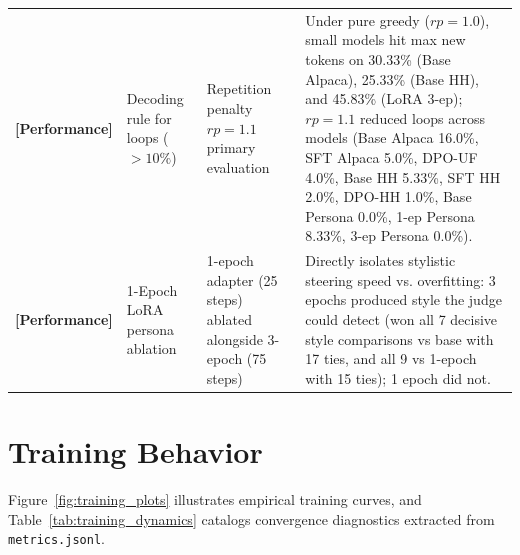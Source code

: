 \documentclass[11pt,a4paper]{article}
\begin{document}
\begin{table}[t]
\begin{tabularx}{\textwidth}{lp{2.5cm}p{3.2cm}X}
\textbf{[Performance]} & Decoding rule for loops ($>10\%$) & Repetition penalty $rp=1.1$ primary evaluation & Under pure greedy ($rp=1.0$), small models hit max new tokens on 30.33\% (Base Alpaca), 25.33\% (Base HH), and 45.83\% (LoRA 3-ep); $rp=1.1$ reduced loops across models (Base Alpaca 16.0\%, SFT Alpaca 5.0\%, DPO-UF 4.0\%, Base HH 5.33\%, SFT HH 2.0\%, DPO-HH 1.0\%, Base Persona 0.0\%, 1-ep Persona 8.33\%, 3-ep Persona 0.0\%). \\
\textbf{[Performance]} & 1-Epoch LoRA persona ablation & 1-epoch adapter (25 steps) ablated alongside 3-epoch (75 steps) & Directly isolates stylistic steering speed vs. overfitting: 3 epochs produced style the judge could detect (won all 7 decisive style comparisons vs base with 17 ties, and all 9 vs 1-epoch with 15 ties); 1 epoch did not. \\
\bottomrule
\end{tabularx}
\end{table}

\section{Training Behavior}
\label{sec:training_behavior}

Figure~\ref{fig:training_plots} illustrates empirical training curves, and Table~\ref{tab:training_dynamics} catalogs convergence diagnostics extracted from \texttt{metrics.jsonl}.
\end{document}
